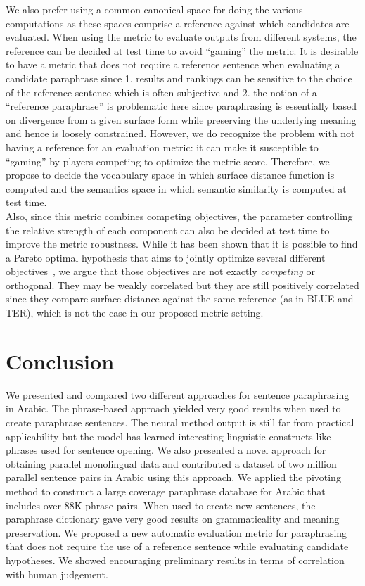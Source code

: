 \documentclass[11pt,letterpaper]{article}
\begin{document}
\noindent We also prefer using a common canonical space for doing the various computations as these spaces comprise a reference against which candidates are evaluated. When using the metric to evaluate outputs from different systems, the reference can be decided at test time to avoid ``gaming'' the metric. It is desirable to have a metric that does not require a reference sentence when evaluating a candidate paraphrase since 1. results and rankings can be sensitive to the choice of the reference sentence which is often subjective and 2. the notion of a ``reference paraphrase'' is problematic here since paraphrasing is essentially based on divergence from a given surface form while preserving the  underlying meaning and hence is loosely constrained. However, we do recognize the problem with not having a reference for an evaluation metric: it can make it susceptible to ``gaming'' by players competing to optimize the metric score. Therefore, we propose to decide the vocabulary space in which surface distance function is computed and the semantics space in which semantic similarity is computed at test time.\\ 

\noindent Also, since this metric combines competing objectives, the parameter controlling the relative strength of each component can also be decided at test time to improve the metric robustness. While it has been shown that it is possible to find a Pareto optimal hypothesis that aims to jointly optimize several different objectives~\cite{Duh:2012:LTM:2390524.2390526}, we argue that those objectives are not exactly \emph{competing} or orthogonal. They may be weakly correlated but they are still positively correlated since they compare surface distance against the same reference (as in BLUE and TER), which is not the case in our proposed metric setting.  
 
\section{Conclusion}

We presented and compared two different approaches for sentence paraphrasing in Arabic. The phrase-based approach yielded very good results when used to create paraphrase sentences. The neural method output is still far from practical applicability but the model has learned interesting linguistic constructs like phrases used for sentence opening. We also presented a novel approach for obtaining parallel monolingual data and contributed a dataset of two million parallel sentence pairs in Arabic using this approach. We applied the pivoting method to construct a large coverage paraphrase database for Arabic that includes over 88K phrase pairs. When used to create new sentences, the paraphrase dictionary gave very good results on grammaticality and meaning preservation. We proposed a new automatic evaluation metric for paraphrasing that does not require the use of a reference sentence while evaluating candidate hypotheses. We showed encouraging preliminary results in terms of correlation with human judgement. 
\end{document}
